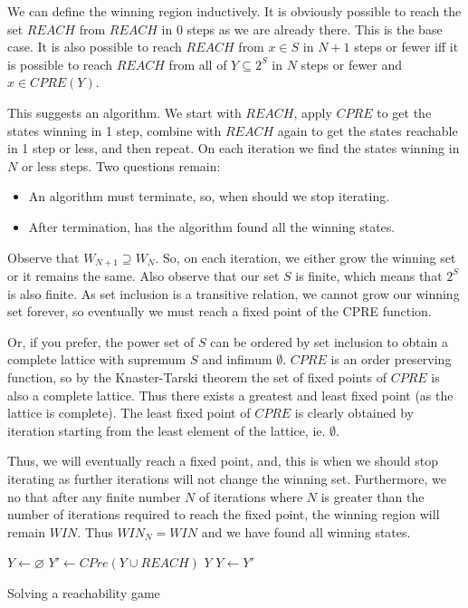 \documentclass{article}
\begin{document}
We can define the winning region inductively. It is obviously possible to reach the set $REACH$ from $REACH$ in 0 steps as we are already there. This is the base case. It is also possible to reach $REACH$ from $x \in S$ in $N + 1$ steps or fewer iff it is possible to reach $REACH$ from all of $Y \subseteq 2^S$ in $N$ steps or fewer and $x \in CPRE(Y)$.

This suggests an algorithm. We start with $REACH$, apply $CPRE$ to get the states winning in 1 step, combine with $REACH$ again to get the states reachable in 1 step or less, and then repeat. On each iteration we find the states winning in $N$ or less steps. Two questions remain: 

\begin{itemize}
    \item An algorithm must terminate, so, when should we stop iterating.
    \item After termination, has the algorithm found all the winning states. 
\end{itemize}

Observe that $W_{N+1} \supseteq W_N$. So, on each iteration, we either grow the winning set or it remains the same. Also observe that our set $S$ is finite, which means that $2^S$ is also finite. As set inclusion is a transitive relation, we cannot grow our winning set forever, so eventually we must reach a fixed point of the CPRE function. 

Or, if you prefer, the power set of $S$ can be ordered by set inclusion to obtain a complete lattice with supremum $S$ and infimum $\emptyset$. $CPRE$ is an order preserving function, so by the Knaster-Tarski theorem the set of fixed points of $CPRE$ is also a complete lattice. Thus there exists a greatest and least fixed point (as the lattice is complete). The least fixed point of $CPRE$ is clearly obtained by iteration starting from the least element of the lattice, ie. $\emptyset$.

Thus, we will eventually reach a fixed point, and, this is when we should stop iterating as further iterations will not change the winning set. Furthermore, we no that after any finite number $N$ of iterations where $N$ is greater than the number of iterations required to reach the fixed point, the winning region will remain $WIN$. Thus $WIN_N = WIN$ and we have found all winning states.

\begin{algorithm}[t]
\begin{algorithmic}
\State $Y \gets \varnothing$
\Loop
\State $Y' \gets CPre(Y \cup REACH)$
\State\Return $Y$\EndIf
\State $Y \gets Y'$
\EndLoop
\EndFunction
\end{algorithmic}
\caption{Solving a reachability game}
\label{a:reach}
\end{algorithm}
\end{document}
